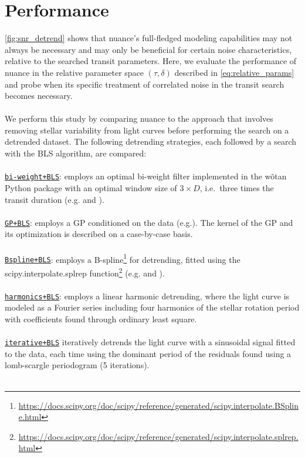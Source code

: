 \documentclass[modern]{aastex631}
\newcommand{\footlink}[1]{\footnote{\url{#1}}}
\begin{document}
\section{Performance}\label{results}
\autoref{fig:snr_detrend} shows that \textsf{nuance}'s full-fledged modeling capabilities may not always be necessary and may only be beneficial for certain noise characteristics, relative to the searched transit parameters. Here, we evaluate the performance of \textsf{nuance} in the relative parameter space $(\tau, \delta)$ described in \autoref{eq:relative_params} and probe when its specific treatment of correlated noise in the transit search becomes necessary.\\\\
We perform this study by comparing \textsf{nuance} to the approach that involves removing stellar variability from light curves before performing the search on a detrended dataset. The following detrending strategies, each followed by a search with the BLS algorithm, are compared:\\\\
\ul{\texttt{bi-weight+BLS}}: employs an optimal bi-weight filter implemented in the \textsf{wõtan} Python package with an optimal window size of $3\times D$, i.e.\, three times the transit duration (e.g.\;\citealt{wotan} and \citealt{Dransfield2024}).\\\\
\ul{\texttt{GP+BLS}}: employs a GP conditioned on the data (e.g.\;\citealt{Lienhard2020}). The kernel of the GP and its optimization is described on a case-by-case basis.\\\\
\ul{\texttt{Bspline+BLS}}: employs a B-spline\footlink{https://docs.scipy.org/doc/scipy/reference/generated/scipy.interpolate.BSpline.html} for detrending, fitted using the \textsf{scipy.interpolate.splrep} function\footlink{https://docs.scipy.org/doc/scipy/reference/generated/scipy.interpolate.splrep.html} (e.g.\;\citealt{wotan} and \citealt{Canocchi2023}).\\\\
\ul{\texttt{harmonics+BLS}}: employs a linear harmonic detrending, where the light curve is modeled as a Fourier series including four harmonics of the stellar rotation period with coefficients found through ordinary least square.\\\\
\ul{\texttt{iterative+BLS}} iteratively detrends the light curve with a sinusoidal signal fitted to the data, each time using the dominant period of the residuals found using a lomb-scargle periodogram (5 iterations).\\\\
\end{document}
